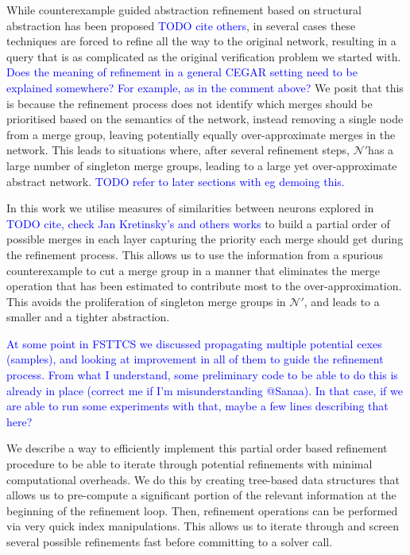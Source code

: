 \documentclass[sigplan,screen,natbib=false]{acmart}
\newcommand{\dmcmt}[1]{\textcolor{blue}{#1}}
\newcommand{\abs}{$\mathcal{N'}$}
\begin{document}
While counterexample guided abstraction refinement based on structural
abstraction has been proposed \cite{cegar-nn} \dmcmt{TODO cite others}, in
several cases these techniques are forced to refine all the way to the original
network, resulting in a query that is as complicated as the original
verification problem we started with. \dmcmt{Does the meaning of refinement in a
general CEGAR setting need to be explained somewhere? For example, as in the
comment above?} We posit that this is because the refinement process does not
identify which merges should be prioritised based on the semantics of the
network, instead removing a single node from a merge group, leaving potentially
equally over-approximate merges in the network. This leads to situations where,
after several refinement steps, \abs has a large number of singleton merge
groups, leading to a large yet over-approximate abstract network. 
\dmcmt{TODO refer to later sections with eg demoing this.} 

In this work we utilise measures of similarities between neurons explored in
\dmcmt{TODO cite, check Jan Kretinsky's and others works} to build a partial
order of possible merges in each layer capturing the priority each merge should
get during the refinement process. This allows us to use the information from a
spurious counterexample to cut a merge group in a manner that eliminates the
merge operation that has been estimated to contribute most to the
over-approximation. This avoids the proliferation of singleton merge groups in
\abs, and leads to a smaller and a tighter abstraction.

\dmcmt{
    At some point in FSTTCS we discussed propagating multiple potential cexes
    (samples), and looking at improvement in all of them to guide the refinement
    process. From what I understand, some preliminary code to be able to do this
    is already in place (correct me if I'm misunderstanding @Sanaa). In that
    case, if we are able to run some experiments with that, maybe a few lines
    describing that here?
}

We describe a way to efficiently implement this partial order based refinement
procedure to be able to iterate through potential refinements with minimal
computational overheads. We do this by creating tree-based data structures that
allows us to pre-compute a significant portion of the relevant information at
the beginning of the refinement loop. Then, refinement operations can be
performed via very quick index manipulations. This allows us to iterate through
and screen several possible refinements fast before committing to a solver call.
\end{document}

